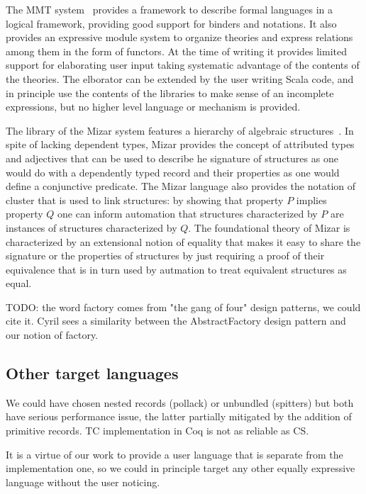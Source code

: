 \documentclass[a4paper,UKenglish,cleveref, autoref]{lipics-v2019}
\newcommand{\factory}{factory}
\theoremstyle{implem}
\theoremstyle{implem}
\theoremstyle{axiom}
\theoremstyle{abscommand}
\theoremstyle{command}
\begin{document}
{{The MMT system~\cite{RABE20131} provides a framework to describe formal
languages in a logical framework, providing good support for binders and
notations. It also provides an expressive module system to organize
theories and express relations among them in the form of functors.
At the time of writing
it provides limited support for elaborating user input taking systematic
advantage of the contents of the theories. The elborator can be extended
by the user writing Scala code, and in principle use the contents of the
libraries to make sense of an incomplete expressions, but no higher level
language or mechanism is provided.

The library of the Mizar system features a hierarchy of algebraic
structures~\cite{7733265}. In spite of lacking dependent types, Mizar
provides the concept of attributed types and adjectives
that can be used to describe he signature of structures as one would
do with a dependently typed record and their properties as
one would define a conjunctive predicate.
The Mizar language also provides the notation of cluster that is used
to link structures: by showing that property $P$ implies property $Q$
one can inform automation that structures characterized by $P$ are
instances of structures characterized by $Q$. The foundational theory of Mizar
is characterized by an extensional notion of equality that makes it easy
to share the signature or the properties of structures by just requiring
a proof of their equivalence that is in turn used by autmation to treat
equivalent structures as equal.

TODO: the word \factory{} comes from "the gang of four" design patterns, we
could cite it. Cyril sees a similarity between the AbstractFactory design
pattern and our notion of factory.

\subsection{Other target languages}

We could have chosen nested records (pollack) or unbundled (spitters)
but both have serious performance issue, the latter partially mitigated by
the addition of primitive records. TC implementation in Coq is not as
reliable as CS.

It is a virtue of our work to provide a user language that is separate
from the implementation one, so we could in principle target any other
equally expressive language without the user noticing.

}}
\end{document}
